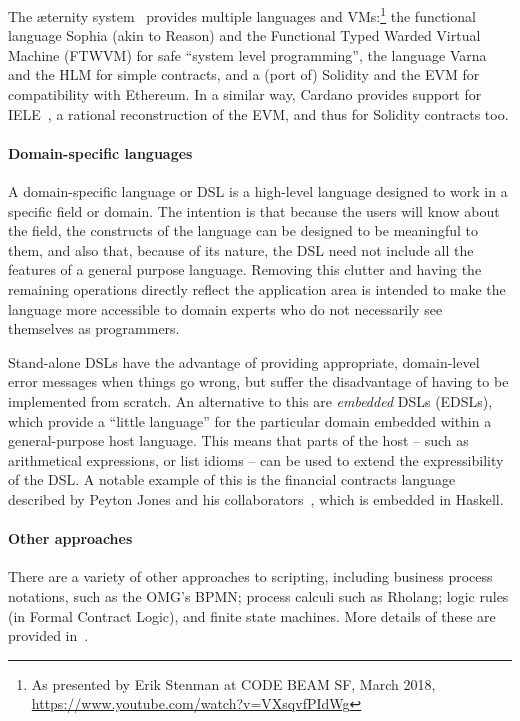 \documentclass[
      acmsmall
    , screen
    , review=true
  ]{acmart}
\begin{document}
The \ae{}ternity system~\cite{aeternity} provides multiple languages and VMs:\footnote{As presented by Erik Stenman at CODE BEAM SF, March 2018, \url{https://www.youtube.com/watch?v=VXsqvfPIdWg}} the functional language  Sophia (akin to Reason) and the Functional Typed Warded Virtual Machine (FTWVM) for safe ``system level programming'', the language Varna and the HLM for simple contracts, and a (port of) Solidity and the EVM for compatibility with Ethereum. In a similar way, Cardano provides support for IELE~, a rational reconstruction of the EVM, and thus for Solidity contracts too. 

\paragraph{Domain-specific languages} 

A domain-specific language or DSL is a high-level language designed to work in a specific field or domain. The intention 
is that because the users will know about the field, the constructs of the language can be designed to be meaningful to 
them, and also that, because of its nature, the DSL need not include all the features of a general purpose language. 
Removing this clutter and having the remaining operations directly reflect the application area is intended to make the 
language more accessible to domain experts who do not necessarily see themselves as programmers.

Stand-alone DSLs have the advantage of providing appropriate, domain-level error messages when things go wrong, but suffer the disadvantage of having to be implemented from scratch. An alternative to this are \emph{embedded} DSLs (EDSLs), which provide a ``little language'' for the particular domain embedded within a general-purpose host language. This means that parts of the host -- such as arithmetical expressions, or list idioms --  can be used to extend the expressibility of the DSL. A notable example of this is the financial contracts language described by Peyton Jones and his collaborators~\cite{PeytonJones:2000}, which is embedded in Haskell.

\paragraph{Other approaches}

There are a variety of other approaches to scripting, including business process notations, such as the OMG's BPMN; process calculi such as Rholang; logic rules (in Formal Contract Logic), and finite state machines. More details of these are provided in~\cite{cryptoeprint:2016:1156}.
\end{document}
